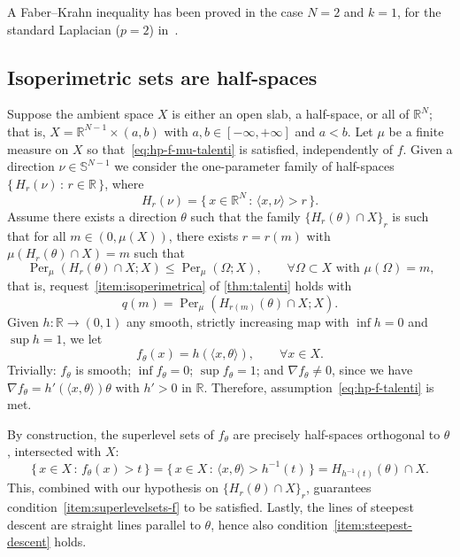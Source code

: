\documentclass[a4paper,12pt,reqno]{amsart}
\numberwithin{equation}{section}
\newcommand{\R}{\mathbb{R}}
\newcommand{\Rn}{\mathbb{R}^N}
\DeclareMathOperator{\Per}{Per}
\theoremstyle{plain}
\theoremstyle{definition}
\begin{document}
A Faber--Krahn inequality has been proved in the case $N=2$ and $k=1$, for the standard Laplacian ($p=2$) in~\cite{MS81}.

\subsection{Isoperimetric sets are half-spaces}
%
Suppose the ambient space $X$ is either an open slab, a half-space, or all of $\Rn$; that is, $X=\R^{N-1}\times(a,b)$ with $a, b \in [-\infty, +\infty]$ and $a < b$. Let $\mu$ be a finite measure on $X$ so that~\eqref{eq:hp-f-mu-talenti} is satisfied, independently of $f$. Given a direction $\nu \in \mathbb{S}^{N-1}$ we consider the one-parameter family of half-spaces $\{\,H_r(\nu)\,:\, r\in\mathbb{R}\,\}$, where
%
\[
H_r(\nu)=\{\, x \in \R^{N}\,:\,\langle x,\nu\rangle>r\,\}.
\]
%
Assume there exists a direction $\theta$ such that the family $\{H_r(\theta)\cap X\}_r$ is such that for all $m\in(0,\mu(X))$, there exists $r=r(m)$ with $\mu(H_r(\theta)\cap X)=m$ such that
%
\begin{equation}
\label{eq:iso-half-spaces}
\Per_\mu (H_r(\theta)\cap X; X) \le \Per_\mu(\Omega; X),
\qquad \forall \Omega\subset X
\text{ with $\mu(\Omega)=m$,}
\end{equation}
%
that is, request~\ref{item:isoperimetrica} of \cref{thm:talenti} holds with
%
\[
q(m) = \Per_\mu(H_{r(m)}(\theta)\cap X; X).
\]
%
Given $h:\R\to (0,1)$ any smooth, strictly increasing map with $\inf h=0$ and $\sup h=1$, we let 
%
\begin{equation}\label{eq:def-f-halfspaces}
f_{\theta}(x)=h(\langle x,\theta\rangle), \qquad \forall x \in X.
\end{equation}
%
Trivially: $f_{\theta}$ is smooth; $\inf f_{\theta}=0$; $\sup f_{\theta} =1$; and $\nabla f_{\theta} \neq 0$, since we have $\nabla f_{\theta}=h'(\langle x,\theta \rangle )\theta$ with $h'>0$ in $\R$. Therefore, assumption~\eqref{eq:hp-f-talenti} is met. 

By construction, the superlevel sets of $f_{\theta}$ are precisely half-spaces orthogonal to $\theta$, intersected with $X$:
%
\[
\{\, x \in X\,:\,f_{\theta}(x)>t\,\}
=
\{\, x \in X\,:\,\langle x,\theta\rangle>h^{-1}(t)\,\}=H_{h^{-1}(t)}(\theta)\cap X.
\]
%
This, combined with our hypothesis on $\{H_r(\theta)\cap X\}_{r}$, guarantees condition~\ref{item:superlevelsets-f} to be satisfied. Lastly, the lines of steepest descent are straight lines parallel to $\theta$, hence also condition~\ref{item:steepest-descent} holds.
\end{document}
